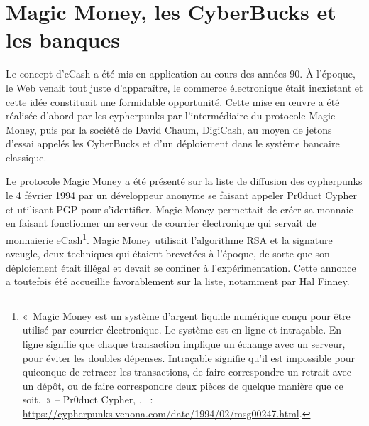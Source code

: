 
\section*{Magic Money, les CyberBucks et les banques} %

Le concept d'eCash a été mis en application au cours des années 90. À l'époque, le Web venait tout juste d'apparaître, le commerce électronique était inexistant et cette idée constituait une formidable opportunité. Cette mise en œuvre a été réalisée d'abord par les cypherpunks par l'intermédiaire du protocole Magic Money, puis par la société de David Chaum, DigiCash, au moyen de jetons d'essai appelés les CyberBucks et d'un déploiement dans le système bancaire classique. %

Le protocole Magic Money a été présenté sur la liste de diffusion des cypherpunks le 4 février 1994 par un développeur anonyme se faisant appeler Pr0duct Cypher et utilisant PGP pour s'identifier. Magic Money permettait de créer sa monnaie en faisant fonctionner un serveur de courrier électronique qui servait de monnaierie eCash\footnote{«~Magic Money est un système d'argent liquide numérique conçu pour être utilisé par courrier électronique. Le système est en ligne et intraçable. En ligne signifie que chaque transaction implique un échange avec un serveur, pour éviter les doubles dépenses. Intraçable signifie qu'il est impossible pour quiconque de retracer les transactions, de faire correspondre un retrait avec un dépôt, ou de faire correspondre deux pièces de quelque manière que ce soit.~» -- Pr0duct Cypher, , ~: \url{https://cypherpunks.venona.com/date/1994/02/msg00247.html}.}. Magic Money utilisait l'algorithme RSA et la signature aveugle, deux techniques qui étaient brevetées à l'époque, de sorte que son déploiement était  illégal et devait se confiner à l'expérimentation. Cette annonce a toutefois été accueillie favorablement sur la liste, notamment par Hal Finney.

